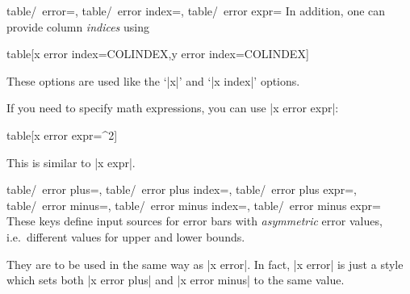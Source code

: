 {\begin{pgfplotsxykeylist}{%
	table/\x\ error=,
	table/\x\ error index=,
	table/\x\ error expr=}
In addition, one can provide column \emph{indices} using
\begin{codeexample}
\addplot table[x error index=COLINDEX,y error index=COLINDEX]
\end{codeexample}
These options are used like the `|x|' and `|x index|' options.

If you need to specify math expressions, you can use |x error expr|:
\begin{codeexample}
\addplot table[x error expr=^2]
\end{codeexample}
This is similar to |x expr|.
\end{pgfplotsxykeylist}

\begin{pgfplotsxykeylist}{%
	table/\x\ error plus=,
	table/\x\ error plus index=,
	table/\x\ error plus expr=,
	table/\x\ error minus=,
	table/\x\ error minus index=,
	table/\x\ error minus expr=%
}
	These keys define input sources for error bars with \emph{asymmetric} error values, i.e.\ different values for upper and lower bounds. 
	
	They are to be used in the same way as |x error|. In fact, |x error| is just a style which sets both |x error plus| and |x error minus| to the same value.

\begin{codeexample}[]
\end{codeexample}
\end{pgfplotsxykeylist}

}%
